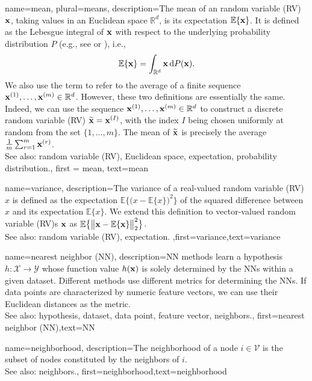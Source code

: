 {
	name={mean}, plural={means},
	description={The  mean of an random variable (RV) ${\bf x}$, taking 
 values in an Euclidean space $\mathbb{R}^{d}$, is its 
 expectation $\mathbb{E} \{{\bf x}\}$. It is defined as the Lebesgue 
 integral of ${\bf x}$ with respect to the underlying probability distribution $P$ (e.g., see \cite{BillingsleyProbMeasure} or \cite{RudinBookPrinciplesMatheAnalysis}), i.e.,
\[
\mathbb{E} \{{\bf x}\} = \int_{\mathbb{R}^{d}} {\bf x} \, \mathrm{d}P({\bf x}).
\] 
We also use the term to refer to the average of a finite sequence 
${\bf x}^{(1)}, \ldots, {\bf x}^{(m)} \in \mathbb{R}^{d}$. However, 
these two definitions are essentially the same. Indeed, we can use the sequence 
${\bf x}^{(1)}, \ldots, {\bf x}^{(m)} \in \mathbb{R}^{d}$ to construct a 
discrete random variable (RV) $\widetilde{{\bf x}}={\bf x}^{(I)}$, with the index $I$ being chosen uniformly 
at random from the set $\{1,\ldots,m\}$. The mean of $\widetilde{{\bf x}}$ is 
precisely the average $\frac{1}{m} \sum_{r=1}^{m} {\bf x}^{(r)}$.
			\\ 
		See also: random variable (RV), Euclidean space, expectation, probability distribution.}, 
		first = {mean}, text={mean} 
}

{
	name={variance},
	description={The variance of a real-valued random variable (RV) $x$ is defined as the expectation 
		$\mathbb{E} \big\{ \big( x - \mathbb{E} \{x \} \big)^{2} \big\}$ of the squared difference between $x$ 
		and its expectation $\mathbb{E} \{x \}$. We extend this definition to vector-valued random variable (RV)s ${\bf x}$ 
		as $\mathbb{E} \big\{ \big\| {\bf x} - \mathbb{E} \{{\bf x} \} \big\|_{2}^{2} \big\}$.
					\\ 
		See also: random variable (RV), expectation.} ,first={variance},text={variance} 
}

{
	name={nearest neighbor (NN)},
	description={NN methods learn a hypothesis 
		$h: \mathcal{X} \rightarrow \mathcal{Y}$ whose function value $h({\bf x})$ 
		is solely determined by the NNs within a given dataset. Different 
		methods use different metrics for determining the NNs. If data points 
		are characterized by numeric feature vectors, we can use their Euclidean distances as 
		the metric.
					\\ 
		See also: hypothesis, dataset, data point, feature vector, neighbors.},
	first={nearest neighbor (NN)},text={NN} 
}

{
	name={neighborhood},
	description={The neighborhood of a node $i \in \mathcal{V}$ is 
	the subset of nodes constituted by the neighbors of $i$.
				\\ 
		See also: neighbors.},
	first={neighborhood},text={neighborhood} 
}


